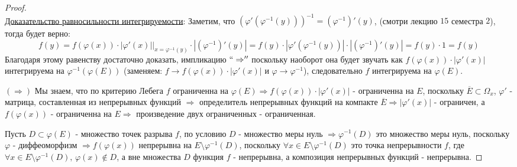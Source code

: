 \documentclass[12pt]{article}
\theoremstyle{definition}
\newcommand{\ovl}[1]{\overline{#1}}
\begin{document}
\begin{proof}\hfill\\
	\uline{Доказательство равносильности интегрируемости}: Заметим, что $\left(\varphi'(\varphi^{-1}(y)) \right)^{-1} = (\varphi^{-1})'(y)$, (смотри лекцию $15$ семестра $2$), тогда будет верно:
	$$
		f(y) = f(\varphi(x)){\cdot}|\varphi'(x)| \Big|_{x = \varphi^{-1}(y)}{\cdot}|(\varphi^{-1})'(y)| = f(y){\cdot}|\varphi'(\varphi^{-1}(y))|{\cdot}|(\varphi^{-1})'(y)| = f(y){\cdot}1 = f(y)
	$$
	Благодаря этому равенству достаточно доказать, импликацию $``\Rightarrow''$ поскольку наоборот она будет звучать как $f(\varphi(x)){\cdot}|\varphi'(x)|$ интегрируема на $\varphi^{-1}(\varphi (E))$ (заменяем: $f \to f(\varphi(x)){\cdot}|\varphi'(x)|$ и $\varphi \to \varphi^{-1}$), следовательно $f$ интегрируема на $\varphi(E)$. 
	
	$(\Rightarrow)$ Мы знаем, что по критерию Лебега $f$ ограниченна на $\varphi(E) \Rightarrow f(\varphi(x)){\cdot}|\varphi'(x)|$ - ограниченна на $E$, поскольку $\ovl{E} \subset \Omega_x$, $\varphi'$ - матрица, составленная из непрерывных функций $\Rightarrow$ определитель непрерывных функций на компакте $\ovl{E} \Rightarrow |\varphi'(x)|$ - ограничен, а $f(\varphi(x))$ - ограниченна на $E \Rightarrow$ произведение двух ограниченных - ограниченная. 
	
	Пусть $D \subset \varphi(E)$ -  множество точек разрыва $f$, по условию $D$ - множество меры нуль $\Rightarrow \varphi^{-1}(D)$ это множество меры нуль, поскольку $\varphi$ - диффеоморфизм $\Rightarrow f(\varphi(x))$ непрерывна на $E \setminus \varphi^{-1}(D)$, поскольку $\forall x \in E \setminus \varphi^{-1}(D)$ это точка непрерывности $f$, где $\forall x \in E \setminus \varphi^{-1}(D), \, \varphi(x) \not\in D$, а вне множества $D$ функция $f$ - непрерывна, а композиция непрерывных функций - непрерывна.
\end{proof}
\end{document}
